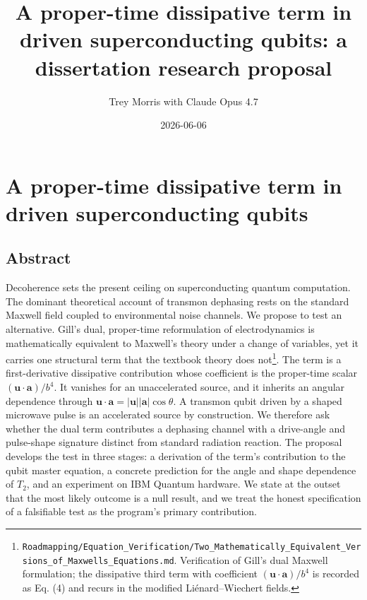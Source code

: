 \documentclass[
  11pt,
]{article}
\title{A proper-time dissipative term in driven superconducting qubits:
a dissertation research proposal}
\author{Trey Morris with Claude Opus 4.7}
\date{2026-06-06}
\begin{document}
\maketitle

\hypertarget{a-proper-time-dissipative-term-in-driven-superconducting-qubits}{%
\section{A proper-time dissipative term in driven superconducting
qubits}\label{a-proper-time-dissipative-term-in-driven-superconducting-qubits}}

\hypertarget{abstract}{%
\subsection{Abstract}\label{abstract}}

Decoherence sets the present ceiling on superconducting quantum
computation. The dominant theoretical account of transmon dephasing
rests on the standard Maxwell field coupled to environmental noise
channels. We propose to test an alternative. Gill's dual, proper-time
reformulation of electrodynamics is mathematically equivalent to
Maxwell's theory under a change of variables, yet it carries one
structural term that the textbook theory does not\footnote{\texttt{Roadmapping/Equation\_Verification/Two\_Mathematically\_Equivalent\_Versions\_of\_Maxwells\_Equations.md}.
  Verification of Gill's dual Maxwell formulation; the dissipative third
  term with coefficient \((\mathbf{u}\!\cdot\!\mathbf{a})/b^4\) is
  recorded as Eq. (4) and recurs in the modified Liénard--Wiechert
  fields.}. The term is a first-derivative dissipative contribution
whose coefficient is the proper-time scalar
\((\mathbf{u}\!\cdot\!\mathbf{a})/b^4\). It vanishes for an
unaccelerated source, and it inherits an angular dependence through
\(\mathbf{u}\!\cdot\!\mathbf{a}=|\mathbf{u}||\mathbf{a}|\cos\theta\). A
transmon qubit driven by a shaped microwave pulse is an accelerated
source by construction. We therefore ask whether the dual term
contributes a dephasing channel with a drive-angle and pulse-shape
signature distinct from standard radiation reaction. The proposal
develops the test in three stages: a derivation of the term's
contribution to the qubit master equation, a concrete prediction for the
angle and shape dependence of \(T_2\), and an experiment on IBM Quantum
hardware. We state at the outset that the most likely outcome is a null
result, and we treat the honest specification of a falsifiable test as
the program's primary contribution.
\end{document}
